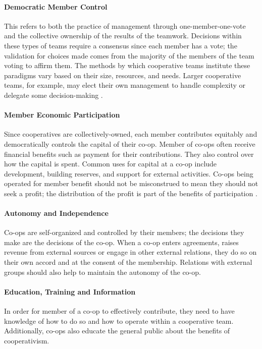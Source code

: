 \paragraph{Democratic Member Control} This refers to both the practice of management through one-member-one-vote and the collective ownership of the results of the teamwork. Decisions within these types of teams require a consensus since each member has a vote; the validation for choices made comes from the majority of the members of the team voting to affirm them. The methods by which cooperative teams institute these paradigms vary based on their size, resources, and needs. Larger cooperative teams, for example, may elect their own management to handle complexity or delegate some decision-making \autocite[21]{northcountry_cooperative_foundation_worker_2006}. 

\paragraph{Member Economic Participation} Since cooperatives are collectively-owned, each member contributes equitably and democratically controls the capital of their co-op. Member of co-ops often receive financial benefits such as payment for their contributions. They also control over how the capital is spent. Common uses for capital at a co-op include development, building reserves, and support for external activities. Co-ops being operated for member benefit should not be misconstrued to mean they should not seek a profit; the distribution of the profit is part of the benefits of participation \autocite[29]{boland_introduction_2017}. 

\paragraph{Autonomy and Independence} Co-ops are self-organized and controlled by their members; the decisions they make are the decisions of the co-op. When a co-op enters agreements, raises revenue from external sources or engage in other external relations, they do so on their own accord and at the consent of the membership. Relations with external groups should also help to maintain the autonomy of the co-op. 

\paragraph{Education, Training and Information} In order for member of a co-op to effectively contribute, they need to have knowledge of how to do so and how to operate within a cooperative team. Additionally, co-ops also educate the general public about the benefits of cooperativism.

